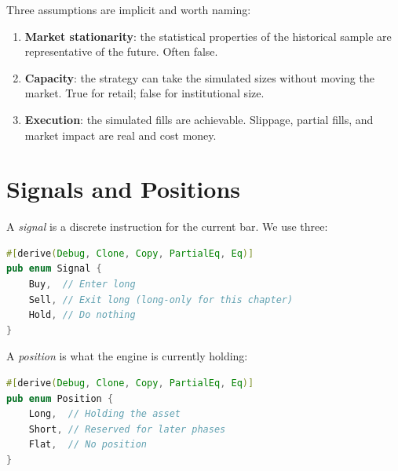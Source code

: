 
Three assumptions are implicit and worth naming:

\begin{enumerate}
    \item \textbf{Market stationarity}: the statistical properties of the
      historical sample are representative of the future. Often false.
    \item \textbf{Capacity}: the strategy can take the simulated sizes without
      moving the market. True for retail; false for institutional size.
    \item \textbf{Execution}: the simulated fills are achievable. Slippage,
      partial fills, and market impact are real and cost money.
\end{enumerate}

\section{Signals and Positions}


A \emph{signal} is a discrete instruction for the current bar. We use three:

\begin{lstlisting}[language=Rust]
#[derive(Debug, Clone, Copy, PartialEq, Eq)]
pub enum Signal {
    Buy,  // Enter long
    Sell, // Exit long (long-only for this chapter)
    Hold, // Do nothing
}
\end{lstlisting}

A \emph{position} is what the engine is currently holding:

\begin{lstlisting}[language=Rust]
#[derive(Debug, Clone, Copy, PartialEq, Eq)]
pub enum Position {
    Long,  // Holding the asset
    Short, // Reserved for later phases
    Flat,  // No position
}
\end{lstlisting}

